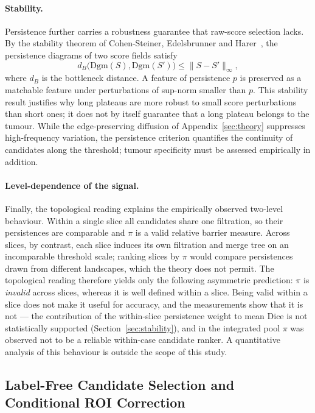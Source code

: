 \documentclass[11pt,a4paper]{article}
\begin{document}
\paragraph{Stability.} Persistence further carries a robustness guarantee that
raw-score selection lacks. By the stability theorem of Cohen-Steiner, Edelsbrunner
and Harer~\cite{cohensteiner2007}, the persistence diagrams of two score fields
satisfy
\begin{equation}
d_B\big(\mathrm{Dgm}(S),\mathrm{Dgm}(S')\big)\le\lVert S-S'\rVert_\infty,
\label{eq:stability}
\end{equation}
where $d_B$ is the bottleneck distance. A feature of persistence $p$ is preserved
as a matchable feature under perturbations of sup-norm smaller than $p$. This
stability result justifies why long plateaus are more robust to small score
perturbations than short ones; it does not by itself guarantee that a long plateau
belongs to the tumour. While the edge-preserving diffusion of
Appendix~\ref{sec:theory} suppresses high-frequency variation, the persistence
criterion quantifies the continuity of candidates along the threshold; tumour
specificity must be assessed empirically in addition.

\paragraph{Level-dependence of the signal.} Finally, the topological reading
explains the empirically observed two-level behaviour. Within a single slice all
candidates share one filtration, so their persistences are comparable and $\pi$ is
a valid relative barrier measure. Across slices, by contrast, each slice induces
its own filtration and merge tree on an incomparable threshold scale; ranking
slices by $\pi$ would compare persistences drawn from different landscapes, which
the theory does not permit. The topological reading therefore yields only the
following asymmetric prediction: $\pi$ is \emph{invalid} across slices, whereas it
is well defined within a slice. Being valid within a slice does not make it useful
for accuracy, and the measurements show that it is not --- the contribution of the
within-slice persistence weight to mean Dice is not statistically supported
(Section~\ref{sec:stability}), and in the integrated pool $\pi$ was observed not to
be a reliable within-case candidate ranker. A quantitative analysis of this
behaviour is outside the scope of this study.

\subsection{Label-Free Candidate Selection and Conditional ROI Correction}\label{sec:selection}
\end{document}
